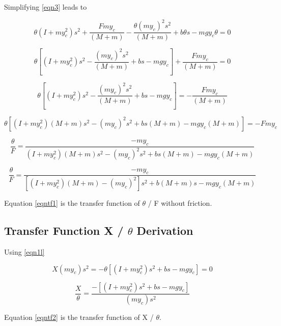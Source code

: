 \documentclass{article}
\begin{document}
Simplifying \ref{eqn3} leads to


\begin{equation} 
\label{eqn3}
\theta (I+m y_c^2) s^2+ \frac{F m y_c}{(M+m)} -\frac{\theta (m y_c)^2 s^2}{(M+m)} + b \theta s - m g y_c \theta = 0 
\end{equation}

\begin{equation} 
\label{eqn3b}
\theta [(I+m y_c^2) s^2 - \frac{(m y_c)^2 s^2}{(M+m)} + b s - m g y_c] +\frac{F m y_c}{(M+m)}  = 0 
\end{equation}

\begin{equation} 
\label{eqn3c}
\theta [(I+m y_c^2) s^2 - \frac{(m y_c)^2 s^2}{(M+m)} + b s - m g y_c] = -\frac{F m y_c}{(M+m)} 
\end{equation}

\begin{equation} 
\label{eqn3d}
\theta [(I+m y_c^2)(M+m) s^2 - (m y_c)^2 s^2 + b s (M+m) - m g y_c (M+m) ] = -F m y_c
\end{equation}

\begin{equation} 
\label{eqn3e}
\frac{\theta}{F} = \frac{-m y_c}{(I+m y_c^2)(M+m) s^2 - (m y_c)^2 s^2 + b s (M+m) - m g y_c (M+m)}
\end{equation}

\begin{equation} 
\label{eqntf1}
\frac{\theta}{F} = \frac{-m y_c}{[(I+m y_c^2)(M+m) - (m y_c)^2]s^2 + b (M+m) s - m g y_c (M+m)}
\end{equation}

Equation \ref{eqntf1} is the transfer function of $\theta$ / F without friction.

\subsection{Transfer Function X / $\theta$ Derivation}

Using \ref{eqn1l}

\begin{equation} 
\label{eqn4}
X (m y_c) s^2 = -\theta [(I+m y_c^2) s^2+b s - m g y_c] = 0 
\end{equation}

\begin{equation} 
\label{eqntf2}
\frac{X}{\theta} = \frac{-[(I+m y_c^2) s^2+b s - m g y_c]}{(m y_c) s^2} 
\end{equation}

Equation \ref{eqntf2} is the transfer function of X / $\theta$.
\end{document}

